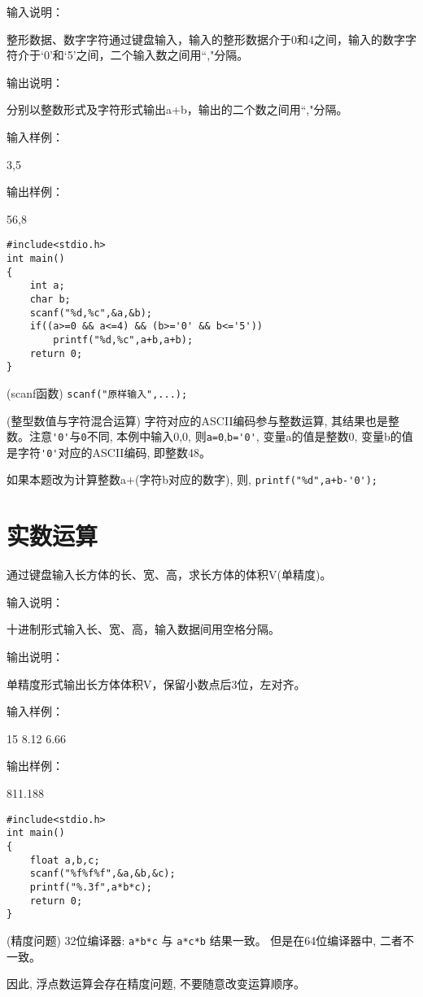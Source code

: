 输入说明：

整形数据、数字字符通过键盘输入，输入的整形数据介于0和4之间，输入的数字字符介于`0'和`5'之间，二个输入数之间用``,"分隔。

输出说明：

分别以整数形式及字符形式输出a+b，输出的二个数之间用``,"分隔。

输入样例：

3,5

输出样例：

56,8

\newpage

\begin{lstlisting}
#include<stdio.h>    
int main()                   
{  
	int a;
	char b;
	scanf("%d,%c",&a,&b);
	if((a>=0 && a<=4) && (b>='0' && b<='5'))
		printf("%d,%c",a+b,a+b); 
	return 0;           
}             
\end{lstlisting}

\begin{note}(scanf函数)
	\lstinline|scanf("原样输入",...); |
\end{note}

\begin{note}(整型数值与字符混合运算)
	字符对应的ASCII编码参与整数运算, 其结果也是整数。注意\lstinline|'0'|与\lstinline|0|不同, 本例中输入0,0, 则\lstinline|a=0|,\lstinline|b='0'|, 变量a的值是整数0, 变量b的值是字符\lstinline|'0'|对应的ASCII编码, 即整数48。
	
	如果本题改为计算整数a+(字符b对应的数字), 则, \lstinline|printf("%d",a+b-'0');|
\end{note}

\section{实数运算}
通过键盘输入长方体的长、宽、高，求长方体的体积V(单精度)。

输入说明：

十进制形式输入长、宽、高，输入数据间用空格分隔。

输出说明：

单精度形式输出长方体体积V，保留小数点后3位，左对齐。

输入样例：

15  8.12  6.66

输出样例：

811.188


\begin{lstlisting}
#include<stdio.h>   
int main()                   
{  
	float a,b,c;
	scanf("%f%f%f",&a,&b,&c);
	printf("%.3f",a*b*c); 
	return 0;           
}                  
\end{lstlisting}

\begin{note}(精度问题)
	32位编译器: \lstinline|a*b*c| 与 \lstinline|a*c*b| 结果一致。
	但是在64位编译器中, 二者不一致。
	
	因此, 浮点数运算会存在精度问题, 不要随意改变运算顺序。
\end{note}
